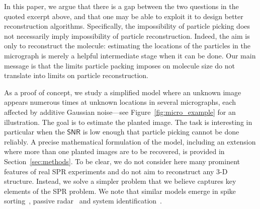 \documentclass[english,11pt]{article}
\newcommand{\1}{\mathbf{1}}
\newcommand{\TODO}[1]{{\color{red}{[#1]}}}
\numberwithin{equation}{section}
\theoremstyle{plain}
\theoremstyle{definition}
\theoremstyle{remark}
\theoremstyle{plain}
\theoremstyle{remark}
\theoremstyle{plain}
\theoremstyle{plain}
\newcommand{\SNR}{\ensuremath{\textsf{SNR}}}
\begin{document}
In this paper, we argue that there is a gap between the two questions in the quoted excerpt above, and that one may be able to exploit it to design better reconstruction algorithms.
Specifically, the impossibility of particle picking does not necessarily imply impossibility of particle reconstruction.
Indeed, the aim is only to reconstruct the molecule: estimating the locations of the particles in the micrograph is merely a helpful intermediate stage when it can be done. Our main message is that the limits particle packing imposes on molecule size do not translate into limits on particle reconstruction.

As a proof of concept, we study a simplified model where an unknown image appears numerous times at unknown locations in several micrographs, each affected by additive Gaussian noise---see Figure~\ref{fig:micro_example} for an illustration.
The goal is to estimate the planted image. The task is interesting in particular when the $\SNR$ is low enough that particle picking cannot be done reliably.
A precise mathematical formulation of the model, including an extension where more than one planted images are to be recovered, is provided in Section~\ref{sec:methods}.
To be clear, we do not consider here many prominent features of real SPR experiments and do not aim to reconstruct any 3-D structure. Instead, we solve a simpler problem that we believe captures key elements of the SPR problem. We note that similar models emerge in spike sorting~\cite{lewicki1998review}, passive radar~\cite{gogineni2017passive} and system identification~\cite{ljung1998system}.
\end{document}
